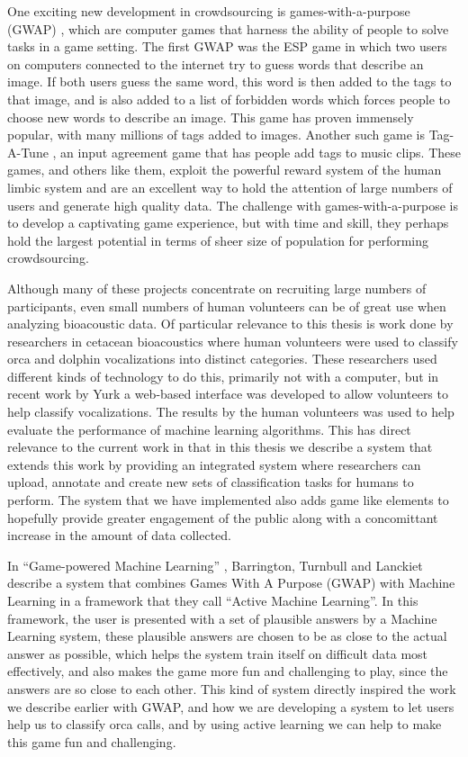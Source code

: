 \documentclass[12pt,oneside]{book}
\begin{document}
One exciting new development in crowdsourcing is games-with-a-purpose
(GWAP) \cite{vonahn08}, which are computer games that harness the
ability of people to solve tasks in a game setting.  The first GWAP
was the ESP game \cite{vonahn04} in which two users on computers
connected to the internet try to guess words that describe an image.
If both users guess the same word, this word is then added to the tags
to that image, and is also added to a list of forbidden words which
forces people to choose new words to describe an image.  This game has
proven immensely popular, with many millions of tags added to images.
Another such game is Tag-A-Tune \cite{law09}, an input agreement game
that has people add tags to music clips.  These games, and others like
them, exploit the powerful reward system of the human limbic system
and are an excellent way to hold the attention of large numbers of
users and generate high quality data.  The challenge with
games-with-a-purpose is to develop a captivating game experience, but
with time and skill, they perhaps hold the largest potential in terms
of sheer size of population for performing crowdsourcing.

Although many of these projects concentrate on recruiting large
numbers of participants, even small numbers of human volunteers can be
of great use when analyzing bioacoustic data.  Of particular relevance
to this thesis is work done by researchers in cetacean bioacoustics
\cite{ford91} \cite{yurk10} \cite{yurkphd} \cite{dolphinwhistles}
where human volunteers were used to classify orca and dolphin
vocalizations into distinct categories.  These researchers used
different kinds of technology to do this, primarily not with a
computer, but in recent work by Yurk \cite{yurk10} \cite{yurkphd} a
web-based interface was developed to allow volunteers to help classify
vocalizations.  The results by the human volunteers was used to help
evaluate the performance of machine learning algorithms.  This has
direct relevance to the current work in that in this thesis we
describe a system that extends this work by providing an integrated
system where researchers can upload, annotate and create new sets of
classification tasks for humans to perform.  The system that we have
implemented also adds game like elements to hopefully provide greater
engagement of the public along with a concomittant increase in the
amount of data collected.

In ``Game-powered Machine Learning'' \cite{barrington12}, Barrington,
Turnbull and Lanckiet describe a system that combines Games With A
Purpose (GWAP) with Machine Learning in a framework that they call
``Active Machine Learning''.  In this framework, the user is presented
with a set of plausible answers by a Machine Learning system, these
plausible answers are chosen to be as close to the actual answer as
possible, which helps the system train itself on difficult data most
effectively, and also makes the game more fun and challenging to play,
since the answers are so close to each other.  This kind of system
directly inspired the work we describe earlier with GWAP, and how we
are developing a system to let users help us to classify orca calls,
and by using active learning we can help to make this game fun and
challenging.
\end{document}
